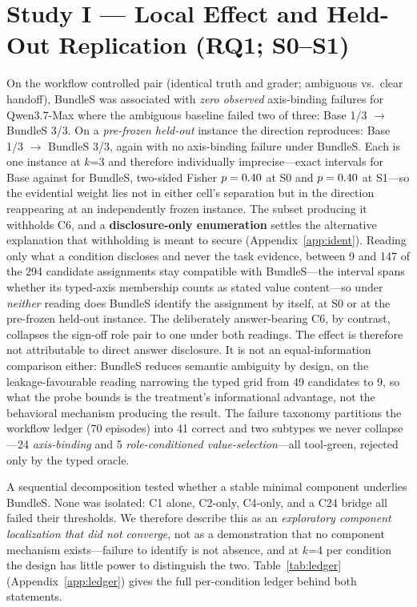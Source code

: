 \documentclass{article}
\begin{document}
\section{Study I --- Local Effect and Held-Out Replication (RQ1; S0--S1)}
\label{sec:studyone}
On the workflow controlled pair (identical truth and grader; ambiguous vs.\ clear handoff), BundleS was associated with \emph{zero observed} axis-binding failures for Qwen3.7-Max where the ambiguous baseline failed two of three: Base 1/3 $\to$ BundleS 3/3. On a \emph{pre-frozen held-out} instance the direction reproduces: Base 1/3 $\to$ BundleS 3/3, again with no axis-binding failure under BundleS. Each is one instance at $k$=3 and therefore individually imprecise---exact intervals \StatSZeroBaseCI{} for Base against \StatSZeroTreatCI{} for BundleS, two-sided Fisher $p=0.40$ at S0 and $p=0.40$ at S1---so the evidential weight lies not in either cell's separation but in the direction reappearing at an independently frozen instance. The subset producing it withholds C6, and a \textbf{disclosure-only enumeration} settles the alternative explanation that withholding is meant to secure (Appendix~\ref{app:ident}). Reading only what a condition discloses and never the task evidence, between 9 and 147 of the 294 candidate assignments stay compatible with BundleS---the interval spans whether its typed-axis membership counts as stated value content---so under \emph{neither} reading does BundleS identify the assignment by itself, at S0 or at the pre-frozen held-out instance. The deliberately answer-bearing C6, by contrast, collapses the sign-off role pair to one under both readings. The effect is therefore not attributable to direct answer disclosure. It is not an equal-information comparison either: BundleS reduces semantic ambiguity by design, on the leakage-favourable reading narrowing the typed grid from 49 candidates to 9, so what the probe bounds is the treatment's informational advantage, not the behavioral mechanism producing the result. The failure taxonomy partitions the workflow ledger (70 episodes) into 41 correct and two subtypes we never collapse---24 \emph{axis-binding} and 5 \emph{role-conditioned value-selection}---all tool-green, rejected only by the typed oracle.

A sequential decomposition tested whether a stable minimal component underlies BundleS. None was isolated: C1 alone, C2-only, C4-only, and a C24 bridge all failed their thresholds. We therefore describe this as an \emph{exploratory component localization that did not converge}, not as a demonstration that no component mechanism exists---failure to identify is not absence, and at $k$=4 per condition the design has little power to distinguish the two. Table~\ref{tab:ledger} (Appendix~\ref{app:ledger}) gives the full per-condition ledger behind both statements.
\end{document}
